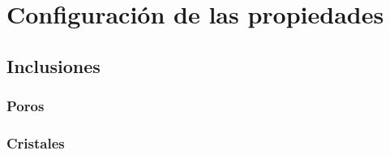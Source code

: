 
\chapter{Configuraci\'on de las propiedades} %

\label{Chapter5} %



\section{Inclusiones}


\subsection{Poros}



\subsection{Cristales}